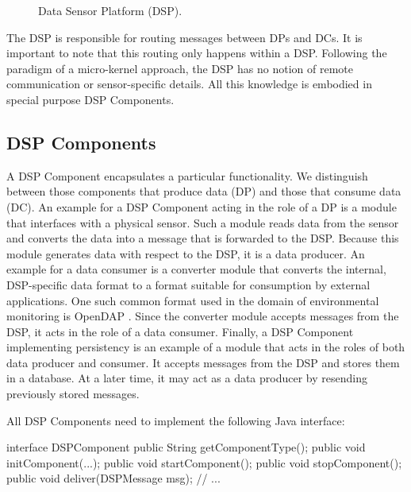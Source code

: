 \documentclass[conference]{IEEEtran}
\begin{document}
\begin{figure}
\centering
{}
\caption{\label{FIG_DSP} Data Sensor Platform (DSP).}
\end{figure}

The DSP is responsible for routing messages between DPs and DCs. It is
important to note that this routing only happens within a
DSP. Following the paradigm of a micro-kernel approach, the DSP has no
notion of remote communication or sensor-specific details. All this
knowledge is embodied in special purpose DSP Components.

\subsection{DSP Components}

A DSP Component encapsulates a particular functionality. We
distinguish between those components that produce data (DP) and those
that consume data (DC). An example for a DSP Component acting in the
role of a DP is a module that interfaces with a physical sensor. Such
a module reads data from the sensor and converts the data into a
message that is forwarded to the DSP. Because this module generates
data with respect to the DSP, it is a data producer. An example for a
data consumer is a converter module that converts the internal,
DSP-specific data format to a format suitable for consumption by
external applications. One such common format used in the domain of
environmental monitoring is OpenDAP \cite{opendap01}.  Since the
converter module accepts messages from the DSP, it acts in the role of
a data consumer. Finally, a DSP Component implementing persistency is
an example of a module that acts in the roles of both data producer
and consumer. It accepts messages from the DSP and stores them in a
database. At a later time, it may act as a data producer by resending
previously stored messages.

All DSP Components need to implement the following Java interface:

\begin{code}
interface DSPComponent
{
   public String getComponentType();
   public void initComponent(...);
   public void startComponent();
   public void stopComponent();
   public void deliver(DSPMessage msg);
   // ...
}
\end{code}
\end{document}
